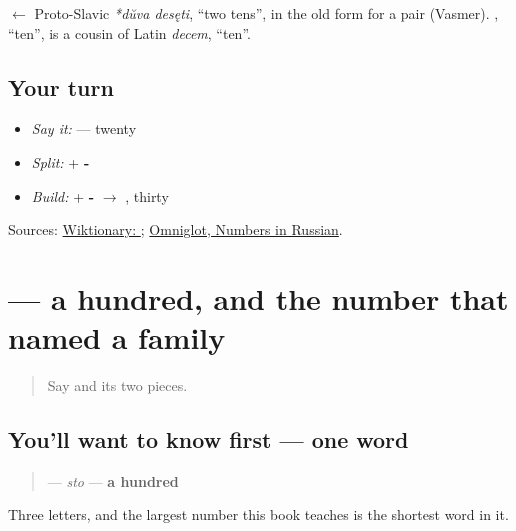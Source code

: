 \begin{cousinweb}
\textbf{} $\leftarrow$ Proto-Slavic \emph{*dŭva desęti}, \textquotedblleft{}two tens\textquotedblright{}, in the old form for a pair (Vasmer). \emph{}, \textquotedblleft{}ten\textquotedblright{}, is a cousin of Latin \emph{decem}, \textquotedblleft{}ten\textquotedblright{}.
\end{cousinweb}

\subsection*{Your turn}
\begin{itemize}
\raggedright
  \item \emph{Say it:} \textbf{} — twenty
  \item \emph{Split:} \textbf{} + \textbf{-}
  \item \emph{Build:} \textbf{} + \textbf{-} $\to$ \textbf{}, thirty
\end{itemize}

\begin{tcolorbox}[breakable,colback=teal!4,colframe=teal!35!black,title={Before you move on}]
Sources: \href{https://en.wiktionary.org/wiki/\%D0\%B4\%D0\%B2\%D0\%B0\%D0\%B4\%D1\%86\%D0\%B0\%D1\%82\%D1\%8C}{Wiktionary: }; \href{https://www.omniglot.com/language/numbers/russian.htm}{Omniglot, Numbers in Russian}.
\end{tcolorbox}
\section[\texorpdfstring{\ru{сто} (sto)}{сто (sto)}]{ — a hundred, and the number that named a family}

\label{lesson:RU-C25-sto}



\begin{quote}
Say \textbf{} and its two pieces.
\end{quote}

\subsection*{You'll want to know first — one word}
\begin{quote}
\textbf{} — \emph{sto} — \textbf{a hundred}
\end{quote}

Three letters, and the largest number this book teaches is the shortest word in it.


